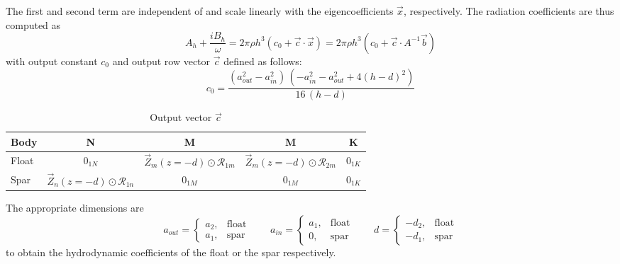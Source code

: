 \begin{appendices}
The first and second term are independent of and scale linearly with the eigencoefficients $\vec{x}$, respectively.
The radiation coefficients are thus computed as
\begin{equation}
    A_h + \frac{iB_h}{\omega}=2\pi \rho h^3(c_0 + \vec{c}\cdot\vec{x}) =2\pi \rho h^3(c_0 + \vec{c} \cdot A^{-1} \vec{b})
\end{equation}
with output constant $c_0$ and output row vector $\vec{c}$ defined as follows:
\begin{equation}
    c_0 =  \frac{\left({a^2_{out}}-{a^2_{in}}\right)\,\left(-{a^2_{in}}-{a^2_{out}}+4(h-d)^2\right)}{16\,\left(h - d\right)}
\end{equation}
\begin{table}[h]
    \centering
    \begin{tabular}{|l|c|c|c|c|} \hline 
          Body&N&  M&  M& K\\ \hline 
          Float&$0_{1N}$&  $\vec{Z}_m(z=-d) \odot\boldsymbol{\mathcal{R}}_{1m}$&  $\vec{Z}_m(z=-d) \odot\boldsymbol{\mathcal{R}}_{2m}$& $0_{1K}$\\ \hline
 Spar& $\vec{Z}_n(z=-d) \odot\boldsymbol{\mathcal{R}}_{1n}$& $0_{1M}$& $0_{1M}$&$0_{1K}$\\\hline
    \end{tabular}
    \caption{Output vector $\vec{c}$}
    \label{tab:MEEM-c-vector}
\end{table}
The appropriate dimensions are
\begin{equation}
    a_{out} = \begin{cases}
        a_2, & \text{float} \\
        a_1, & \text{spar}
    \end{cases} 
    \qquad
    a_{in} = \begin{cases}
        a_1, & \text{float} \\
        0, & \text{spar}
    \end{cases} 
    \qquad
   d = \begin{cases}
        -d_2, & \text{float} \\
        -d_1, & \text{spar}
    \end{cases} 
\end{equation}
to obtain the hydrodynamic coefficients of the float or the spar respectively.


\end{appendices}
